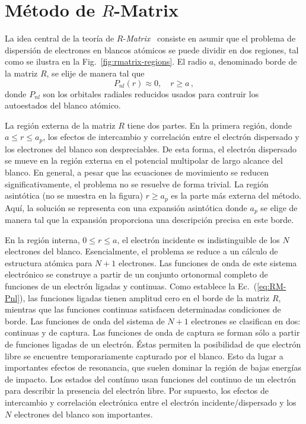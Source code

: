 \section{Método de $R$-Matrix}
\label{sec:proc-rmatrix}

La idea central de la teoría de $R$-\textit{Matrix}~\cite{Burke:11,
Burke:75,Griffin:07} consiste en asumir que el problema de dispersión de 
electrones en blancos atómicos se puede dividir en dos regiones, tal 
como se ilustra en la Fig.~\ref{fig:rmatrix-regions}. El radio $a$,
denominado borde de la matriz $R$, se elije de manera tal que 
\begin{equation}
P_{nl}(r)\approx 0, \quad r\geq a\,,
\label{eq:RM-Pnl}
\end{equation}
donde $P_{nl}$ son los orbitales radiales reducidos usados para
contruir los autoestados del blanco atómico.

La región externa de la matriz $R$ tiene dos partes. En la primera 
región, donde $a\leq r\leq a_p$, los efectos de intercambio y 
correlación entre el electrón dispersado y los electrones del blanco son 
despreciables. De esta forma, el electrón dispersado se mueve en la 
región externa en el potencial multipolar de largo alcance del blanco.
En general, a pesar que las ecuaciones de movimiento se reducen 
significativamente, el problema no se resuelve de forma trivial. 
La región asintótica (no se muestra en la figura) $r\geq a_p$ es la 
parte más externa del método. Aquí, la solución se representa con una 
expansión asintótica donde $a_p$ se elige de manera tal que la expansión 
proporciona una descripción precisa en este borde. 

En la región interna, $0\leq r\leq a$, el electrón incidente es 
indistinguible de los $N$ electrones del blanco. Esencialmente, el 
problema se reduce a un cálculo de estructura atómica para $N+1$ 
electrones. Las funciones de onda de este sistema electrónico se 
construye a partir de un conjunto ortonormal completo de funciones de un 
electrón ligadas y continuas. Como establece la Ec.~(\ref{eq:RM-Pnl}), 
las funciones ligadas tienen amplitud cero en el borde de la matriz $R$, 
mientras que las funciones continuas satisfacen determinadas condiciones 
de borde. Las funciones de onda del sistema de $N+1$ electrones se 
clasifican en dos: continuas y de captura. Las funciones de onda de 
captura se forman sólo a partir de funciones ligadas de un electrón. 
Éstas permiten la posibilidad de que electrón libre se encuentre 
temporariamente capturado por el blanco. Esto da lugar a importantes 
efectos de resonancia, que suelen dominar la región de bajas energías de 
impacto. Los estados del contínuo usan funciones del continuo de un 
electrón para describir la presencia del electrón libre. Por supuesto, 
los efectos de intercambio y correlación electrónica entre el electrón 
incidente/dispersado y los $N$ electrones del blanco son importantes. 

